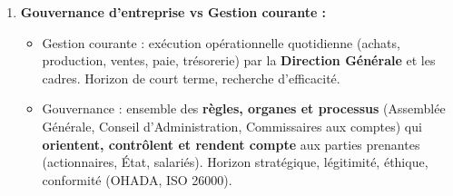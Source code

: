 \documentclass[11pt]{article}
\newcommand{\cle}[1]{{\popxbold\color{popdark}#1}}
\begin{document}
\begin{corrige}
\begin{enumerate}
\begin{itemize}
    \end{itemize}
    \item \textbf{Gouvernance d'entreprise vs Gestion courante :}
    \begin{itemize}
        \item \cle{Gestion courante} : exécution opérationnelle quotidienne (achats, production, ventes, paie, trésorerie) par la \textbf{Direction Générale} et les cadres. Horizon de court terme, recherche d'efficacité.
        \item \cle{Gouvernance} : ensemble des \textbf{règles, organes et processus} (Assemblée Générale, Conseil d'Administration, Commissaires aux comptes) qui \textbf{orientent, contrôlent et rendent compte} aux parties prenantes (actionnaires, État, salariés). Horizon stratégique, légitimité, éthique, conformité (OHADA, ISO 26000).
    \end{itemize}
\end{enumerate}
\end{corrige}
\end{document}
